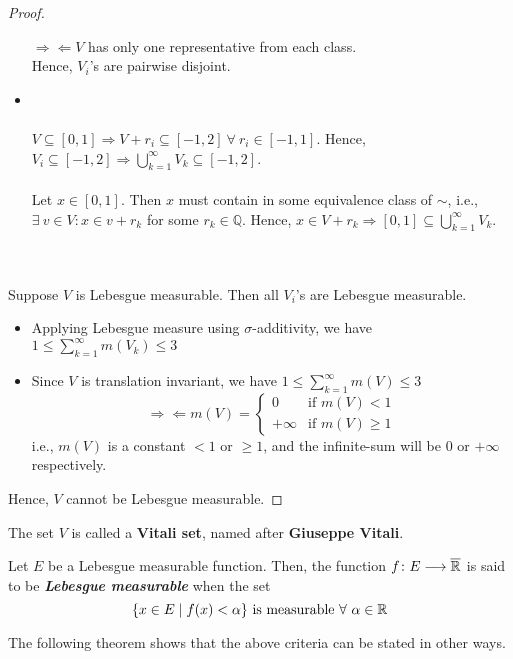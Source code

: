 \documentclass[a4paper]{book}
\begin{document}
\begin{theorem}[Vitali]
\begin{proof}
\begin{itemize}
$\Longrightarrow \Longleftarrow V$ has only one representative from each class. \\ Hence, $V_i$'s are pairwise disjoint. 
\item \claim {} \\ \\
$V \subseteq [0,1] \Longrightarrow V + r_i \subseteq [-1,2]\ \forall\ r_i \in [-1,1]$. Hence, $\displaystyle V_i \subseteq [-1,2] \Longrightarrow \bigcup_{k=1}^\infty V_k \subseteq [-1,2]$.\\ \\
Let $x \in [0,1]$. Then $x$ must contain in some equivalence class of $\sim$, i.e., $\exists\ v \in V : x \in v + r_k$ for some $r_k \in \mathbb{Q}$. Hence, $\displaystyle x \in V + r_k \Longrightarrow [0,1] \subseteq \bigcup_{k=1}^\infty V_k$.
\end{itemize}
\claim {} \\ \\
Suppose $V$ is Lebesgue measurable. Then all $V_i$'s are Lebesgue measurable.
\begin{itemize}
\item Applying Lebesgue measure using $\sigma$-additivity, we have $\displaystyle 1 \leq \sum_{k=1}^{\infty} m(V_k) \leq 3$
\item Since $V$ is translation invariant, we have $\displaystyle 1 \leq \sum_{k=1}^{\infty} m(V) \leq 3$ \[\Longrightarrow \Longleftarrow m(V) = \begin{cases} 0 & \text{if } m(V) < 1 \\ +\infty & \text{if } m(V) \geq 1 \end{cases}\] i.e., $m(V)$ is a constant $<1$ or $\geq 1$, and the infinite-sum will be 0 or $+\infty$ respectively.
\end{itemize}
Hence, $V$ cannot be Lebesgue measurable.
\end{proof}
\end{theorem}
\noindent The set $V$ is called a {\bf Vitali set}, named after {\bf Giuseppe Vitali}.
\begin{definition}
Let $E$ be a Lebesgue measurable function. Then, the function $f\colon E \longrightarrow \overline{\mathbb{R}}$ is said to be {\bf \em Lebesgue measurable} when the set \[ \qty{x\in E \mid f(x)<\alpha} \text{ is measurable}\ \forall\ \alpha\in \mathbb{R}\]
\end{definition}
\noindent The following theorem shows that the above criteria can be stated in other ways.
\end{document}
